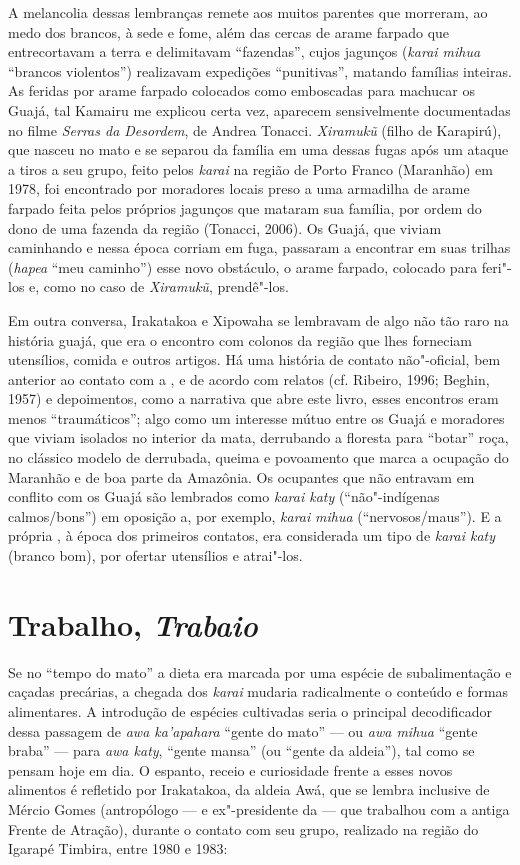 A melancolia dessas lembranças remete aos muitos parentes que morreram,
ao medo dos brancos, à sede e fome, além das cercas de arame farpado que
entrecortavam a terra e delimitavam ``fazendas'', cujos jagunços
(\emph{karai mihua} ``brancos violentos'') realizavam expedições
``punitivas'', matando famílias inteiras. As feridas por arame farpado
colocados como emboscadas para machucar os Guajá, tal Kamairu me
explicou certa vez, aparecem sensivelmente documentadas no filme
\emph{Serras da Desordem}, de Andrea Tonacci. \emph{Xiramukũ} (filho de
Karapirú), que nasceu no mato e se separou da família em uma dessas
fugas após um ataque a tiros a seu grupo, feito pelos \emph{karai} na
região de Porto Franco (Maranhão) em 1978, foi encontrado por moradores
locais preso a uma armadilha de arame farpado feita pelos próprios
jagunços que mataram sua família, por ordem do dono de uma fazenda da
região (Tonacci, 2006). Os Guajá, que viviam caminhando e nessa época
corriam em fuga, passaram a encontrar em suas trilhas (\emph{hapea}
``meu caminho'') esse novo obstáculo, o arame farpado, colocado para
feri"-los e, como no caso de \emph{Xiramukũ}, prendê"-los.

Em outra conversa, Irakatakoa e Xipowaha se lembravam de algo não tão
raro na história guajá, que era o encontro com colonos da região que
lhes forneciam utensílios, comida e outros artigos. Há uma história de
contato não"-oficial, bem anterior ao contato com a , e de acordo
com relatos (cf. Ribeiro, 1996; Beghin, 1957) e depoimentos, como a
narrativa que abre este livro, esses encontros eram menos ``traumáticos'';
algo como um interesse mútuo entre os Guajá e moradores que viviam
isolados no interior da mata, derrubando a floresta para ``botar'' roça,
no clássico modelo de derrubada, queima e povoamento que marca a
ocupação do Maranhão e de boa parte da Amazônia. Os ocupantes que não
entravam em conflito com os Guajá são lembrados como \emph{karai katy}
(``não"-indígenas calmos/bons'') em oposição a, por exemplo, \emph{karai}
\emph{mihua} (``nervosos/maus''). E a própria , à época dos
primeiros contatos, era considerada um tipo de \emph{karai katy} (branco
bom), por ofertar utensílios e atrai"-los.

\section{Trabalho, \emph{Trabaio}}

Se no ``tempo do mato'' a dieta era marcada por uma espécie de
subalimentação e caçadas precárias, a chegada dos \emph{karai} mudaria
radicalmente o conteúdo e formas alimentares. A introdução de espécies
cultivadas seria o principal decodificador dessa passagem de \emph{awa
ka'apahara} ``gente do mato'' --- ou \emph{awa mihua} ``gente braba'' ---
para \emph{awa katy}, ``gente mansa'' (ou ``gente da aldeia''), tal como
se pensam hoje em dia. O espanto, receio e curiosidade frente a esses
novos alimentos é refletido por Irakatakoa, da aldeia Awá, que se
lembra inclusive de Mércio Gomes (antropólogo --- e ex"-presidente da 
--- que trabalhou com a antiga Frente de Atração), durante o contato com
seu grupo, realizado na região do Igarapé Timbira, entre 1980 e 1983:

